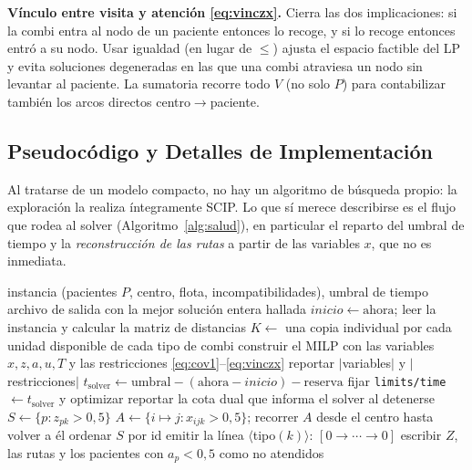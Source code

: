 \documentclass[12pt]{article}
\numberwithin{algorithm}{section}
\begin{document}
\textbf{Vínculo entre visita y atención \eqref{eq:vinczx}.} Cierra las dos implicaciones: si
la combi entra al nodo de un paciente entonces lo recoge, y si lo recoge entonces entró a su
nodo. Usar igualdad (en lugar de $\leq$) ajusta el espacio factible del LP y evita soluciones
degeneradas en las que una combi atraviesa un nodo sin levantar al paciente. La sumatoria
recorre todo $V$ (no solo $P$) para contabilizar también los arcos directos
centro$\to$paciente.

\subsection{Pseudocódigo y Detalles de Implementación}

Al tratarse de un modelo compacto, no hay un algoritmo de búsqueda propio: la exploración
la realiza íntegramente SCIP. Lo que sí merece describirse es el flujo que rodea al solver
(Algoritmo~\ref{alg:salud}), en particular el reparto del umbral de tiempo y la
\emph{reconstrucción de las rutas} a partir de las variables $x$, que no es inmediata.

\begin{algorithm}[H]
\caption{\textsc{Salud} --- modelo compacto MILP}
\label{alg:salud}
\begin{algorithmic}[1]
\Require instancia (pacientes $P$, centro, flota, incompatibilidades), umbral de tiempo
\Ensure archivo de salida con la mejor solución entera hallada
\State $\mathit{inicio} \gets \text{ahora}$; leer la instancia y calcular la matriz de distancias
\State $K \gets$ una copia individual por cada unidad disponible de cada tipo de combi
\State construir el MILP con las variables $x, z, a, u, T$ y las restricciones
    \eqref{eq:cov1}--\eqref{eq:vinczx}
\State reportar $|$variables$|$ y $|$restricciones$|$ 
\State $t_{\text{solver}} \gets \text{umbral} - (\text{ahora} - \mathit{inicio}) - \text{reserva}$
\State fijar \texttt{limits/time} $\gets t_{\text{solver}}$ y optimizar
\State reportar la cota dual que informa el solver al detenerse
 
    \State $S \gets \{p : z_{pk} > 0{,}5\}$ 
    \State $A \gets \{i \mapsto j : x_{ijk} > 0{,}5\}$; recorrer $A$ desde el centro hasta volver a él
     ordenar $S$ por id 
    \EndIf
    \State emitir la línea $\langle$tipo$(k)\rangle$: $[0 \to \cdots \to 0]$
\EndFor
\State escribir $Z$, las rutas y los pacientes con $a_p < 0{,}5$ como no atendidos
\end{algorithmic}
\end{algorithm}
\end{document}
